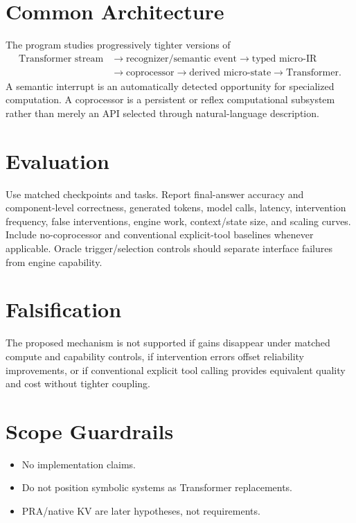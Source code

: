 \documentclass[11pt]{article}
\begin{document}
\section{Common Architecture}
The program studies progressively tighter versions of
\[
\begin{aligned}
\text{Transformer stream}
&\rightarrow \text{recognizer/semantic event}
\rightarrow \text{typed micro-IR} \\
&\rightarrow \text{coprocessor}
\rightarrow \text{derived micro-state}
\rightarrow \text{Transformer}.
\end{aligned}
\]
A semantic interrupt is an automatically detected opportunity for specialized computation. A coprocessor is a persistent or reflex computational subsystem rather than merely an API selected through natural-language description.

\section{Evaluation}
Use matched checkpoints and tasks. Report final-answer accuracy and component-level correctness, generated tokens, model calls, latency, intervention frequency, false interventions, engine work, context/state size, and scaling curves. Include no-coprocessor and conventional explicit-tool baselines whenever applicable. Oracle trigger/selection controls should separate interface failures from engine capability.

\section{Falsification}
The proposed mechanism is not supported if gains disappear under matched compute and capability controls, if intervention errors offset reliability improvements, or if conventional explicit tool calling provides equivalent quality and cost without tighter coupling.

\section{Scope Guardrails}
\begin{itemize}
\item No implementation claims.
\item Do not position symbolic systems as Transformer replacements.
\item PRA/native KV are later hypotheses, not requirements.
\end{itemize}
\end{document}
